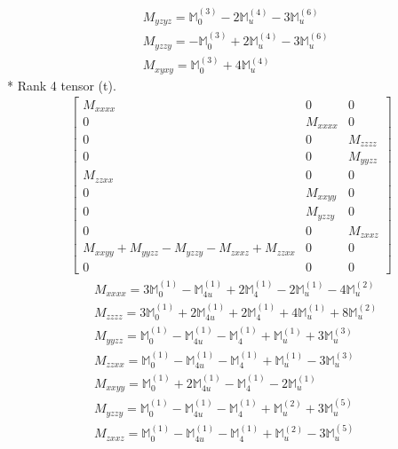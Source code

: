 \documentclass[fleqn,8pt,landscape]{jsarticle}
\begin{document}
\begin{align*}
& M_{yzyz} = \mathbb{M}_{0}^{(3)} - 2 \mathbb{M}_{u}^{(4)} - 3 \mathbb{M}_{u}^{(6)} \\
& M_{yzzy} = - \mathbb{M}_{0}^{(3)} + 2 \mathbb{M}_{u}^{(4)} - 3 \mathbb{M}_{u}^{(6)} \\
& M_{xyxy} = \mathbb{M}_{0}^{(3)} + 4 \mathbb{M}_{u}^{(4)}
\end{align*}
* Rank 4 tensor (t).
\begin{align*}
\begin{bmatrix} M_{xxxx} & 0 & 0 \\ 0 & M_{xxxx} & 0 \\ 0 & 0 & M_{zzzz} \\ 0 & 0 & M_{yyzz} \\ M_{zzxx} & 0 & 0 \\ 0 & M_{xxyy} & 0 \\ 0 & M_{yzzy} & 0 \\ 0 & 0 & M_{zxxz} \\ M_{xxyy} + M_{yyzz} - M_{yzzy} - M_{zxxz} + M_{zzxx} & 0 & 0 \\ 0 & 0 & 0 \end{bmatrix}
\end{align*}
\begin{align*}
& M_{xxxx} = 3 \mathbb{M}_{0}^{(1)} - \mathbb{M}_{4u}^{(1)} + 2 \mathbb{M}_{4}^{(1)} - 2 \mathbb{M}_{u}^{(1)} - 4 \mathbb{M}_{u}^{(2)} \\
& M_{zzzz} = 3 \mathbb{M}_{0}^{(1)} + 2 \mathbb{M}_{4u}^{(1)} + 2 \mathbb{M}_{4}^{(1)} + 4 \mathbb{M}_{u}^{(1)} + 8 \mathbb{M}_{u}^{(2)} \\
& M_{yyzz} = \mathbb{M}_{0}^{(1)} - \mathbb{M}_{4u}^{(1)} - \mathbb{M}_{4}^{(1)} + \mathbb{M}_{u}^{(1)} + 3 \mathbb{M}_{u}^{(3)} \\
& M_{zzxx} = \mathbb{M}_{0}^{(1)} - \mathbb{M}_{4u}^{(1)} - \mathbb{M}_{4}^{(1)} + \mathbb{M}_{u}^{(1)} - 3 \mathbb{M}_{u}^{(3)} \\
& M_{xxyy} = \mathbb{M}_{0}^{(1)} + 2 \mathbb{M}_{4u}^{(1)} - \mathbb{M}_{4}^{(1)} - 2 \mathbb{M}_{u}^{(1)} \\
& M_{yzzy} = \mathbb{M}_{0}^{(1)} - \mathbb{M}_{4u}^{(1)} - \mathbb{M}_{4}^{(1)} + \mathbb{M}_{u}^{(2)} + 3 \mathbb{M}_{u}^{(5)} \\
& M_{zxxz} = \mathbb{M}_{0}^{(1)} - \mathbb{M}_{4u}^{(1)} - \mathbb{M}_{4}^{(1)} + \mathbb{M}_{u}^{(2)} - 3 \mathbb{M}_{u}^{(5)}
\end{align*}
\end{document}
